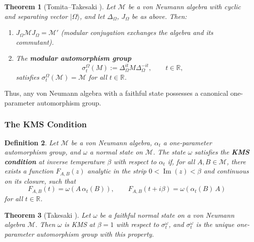 \documentclass[12pt,a4paper,openany]{book}
\newtheorem{theorem}{Theorem}[chapter]
\newtheorem{definition}[theorem]{Definition}
\begin{document}
\begin{theorem}[Tomita--Takesaki {\cite{Takesaki2003}}]
\label{D-thm:TT}
Let $\mathcal{M}$ be a von Neumann algebra with cyclic and separating vector $|\Omega\rangle$, and let $\Delta_\Omega$, $J_\Omega$ be as above. Then:
\begin{enumerate}
\item[(a)] $J_\Omega \mathcal{M} J_\Omega = \mathcal{M}'$ (modular conjugation exchanges the algebra and its commutant).
\item[(b)] The \textbf{modular automorphism group}
\begin{equation}
\sigma_t^\Omega(M) := \Delta_\Omega^{it} M \Delta_\Omega^{-it}, \qquad t \in \mathbb{R},
\end{equation}
satisfies $\sigma_t^\Omega(\mathcal{M}) = \mathcal{M}$ for all $t \in \mathbb{R}$.
\end{enumerate}
\end{theorem}

Thus, any von Neumann algebra with a faithful state possesses a canonical one-parameter automorphism group.

\subsubsection{The KMS Condition}

\begin{definition}
Let $\mathcal{M}$ be a von Neumann algebra, $\alpha_t$ a one-parameter automorphism group, and $\omega$ a normal state on $\mathcal{M}$.
The state $\omega$ satisfies the \textbf{KMS condition} at inverse temperature $\beta$ with respect to $\alpha_t$ if, for all $A, B \in \mathcal{M}$, there exists a function $F_{A,B}(z)$ analytic in the strip $0 < \operatorname{Im}(z) < \beta$ and continuous on its closure, such that
\begin{equation}
F_{A,B}(t) = \omega(A \,\alpha_t(B)), \qquad F_{A,B}(t + i\beta) = \omega(\alpha_t(B)\, A)
\end{equation}
for all $t \in \mathbb{R}$.
\end{definition}

\begin{theorem}[Takesaki {\cite{Takesaki2003}}]
\label{D-thm:KMS-unique}
Let $\omega$ be a faithful normal state on a von Neumann algebra $\mathcal{M}$.
Then $\omega$ is KMS at $\beta = 1$ with respect to $\sigma_t^\omega$, and $\sigma_t^\omega$ is the \emph{unique} one-parameter automorphism group with this property.
\end{theorem}
\end{document}

